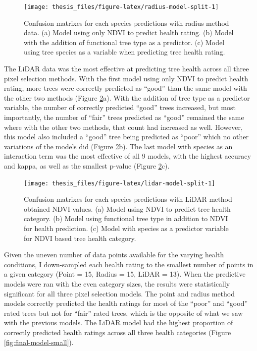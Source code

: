 \documentclass[12pt,twoside]{reedthesis}
\begin{document}
\begin{figure}
\texttt{[image: thesis\_files/figure-latex/radius-model-split-1]} \caption[Confusion matrixes for Radius method predictive models]{Confusion matrixes for each species predictions with radius method data. (a) Model using only NDVI to predict health rating. (b) Model with the addition of functional tree type as a predictor. (c) Model using tree species as a variable when predicting tree health rating.}\label{fig:radius-model-split}
\end{figure}
The LiDAR data was the most effective at predicting tree health across all three pixel selection methods. With the first model using only NDVI to predict health rating, more trees were correctly predicted as ``good'' than the same model with the other two methods (Figure \ref{fig:lidar-model-split}a). With the addition of tree type as a predictor variable, the number of correctly predicted ``good'' trees increased, but most importantly, the number of ``fair'' trees predicted as ``good'' remained the same where with the other two methods, that count had increased as well. However, this model also included a ``good'' tree being predicted as ``poor'' which no other variations of the models did (Figure \ref{fig:lidar-model-split}b). The last model with species as an interaction term was the most effective of all 9 models, with the highest accuracy and kappa, as well as the smallest p-value (Figure \ref{fig:lidar-model-split}c).
\begin{figure}
\texttt{[image: thesis\_files/figure-latex/lidar-model-split-1]} \caption[Confusion matrixes for LiDAR method predictive models]{Confusion matrixes for each species predictions with LiDAR method obtained NDVI values. (a) Model using NDVI to predict tree health category. (b) Model using functional tree type in addition to NDVI for health prediction. (c) Model with species as a predictor variable for NDVI based tree health category.}\label{fig:lidar-model-split}
\end{figure}
Given the uneven number of data points available for the varying health conditions, I down-sampled each health rating to the smallest number of points in a given category (Point = 15, Radius = 15, LiDAR = 13). When the predictive models were ran with the even category sizes, the results were statistically significant for all three pixel selection models. The point and radius method models correctly predicted the health ratings for most of the ``poor'' and ``good'' rated trees but not for ``fair'' rated trees, which is the opposite of what we saw with the previous models. The LiDAR model had the highest proportion of correctly predicted health ratings across all three health categories (Figure \ref{fig:final-model-small}).
\end{document}
